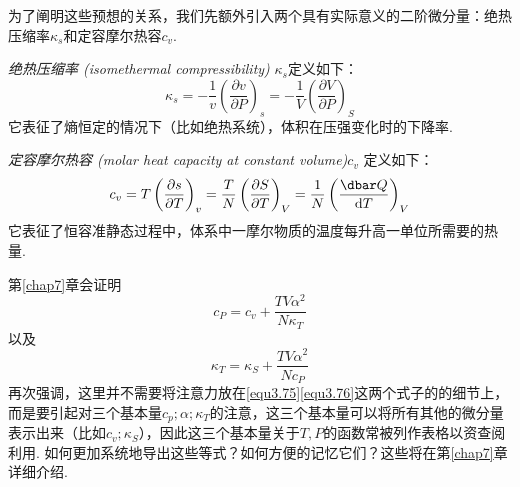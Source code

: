 为了阐明这些预想的关系，我们先额外引入两个具有实际意义的二阶微分量：绝热压缩率$\kappa_s$和定容摩尔热容$c_v$.

{\it 绝热压缩率 (isomethermal compressibility)} $\kappa_s$定义如下：
\begin{equation}
\label{equ3.73}
\kappa_s=-\frac{1}{v}\left(\frac{\partial v}{\partial P}\right)_s=-\frac{1}{V}\left(\frac{\partial V}{\partial P}\right)_S
\end{equation}
它表征了熵恒定的情况下（比如绝热系统），体积在压强变化时的下降率.

{\it 定容摩尔热容 (molar heat capacity at constant volume)}$c_v$ 定义如下：
\begin{equation}
\label{equ3.74}
c_v=T\left(\frac{\partial s}{\partial T}\right)_v=\frac{T}{N}\left(\frac{\partial S}{\partial T}\right)_V=\frac{1}{N}\left(\frac{\dbar Q}{\text{d}T}\right)_V
\end{equation}
它表征了恒容准静态过程中，体系中一摩尔物质的温度每升高一单位所需要的热量.

第\ref{chap7}章会证明
\begin{equation}
\label{equ3.75}
c_P=c_v+\frac{TV\alpha^2}{N\kappa_T}
\end{equation}
以及
\begin{equation}
\label{equ3.76}
\kappa_T=\kappa_S+\frac{TV\alpha^2}{Nc_P}
\end{equation}
再次强调，这里并不需要将注意力放在\eqref{equ3.75}\eqref{equ3.76}这两个式子的的细节上，而是要引起对三个基本量$c_p;\alpha;\kappa_T$的注意，这三个基本量可以将所有其他的微分量表示出来（比如$c_v;\kappa_S$），因此这三个基本量关于$T,P$的函数常被列作表格以资查阅利用. 如何更加系统地导出这些等式？如何方便的记忆它们？这些将在第\ref{chap7}章详细介绍.

